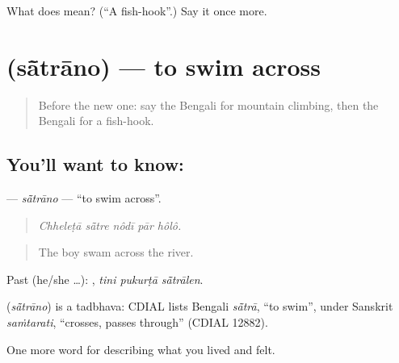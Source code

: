 \begin{tcolorbox}[breakable,colback=teal!4,colframe=teal!35!black,title={Before you move on}]
What does  mean? (\textquotedblleft{}A fish-hook\textquotedblright{}.) Say it once more.
\end{tcolorbox}
\section[\texorpdfstring{\bn{সাঁতরানো} (sā̃trāno)}{সাঁতরানো (sā̃trāno)}]{ (sā̃trāno) — to swim across}

\label{lesson:BN-C523-satrano}



\begin{quote}
Before the new one: say the Bengali for mountain climbing, then the Bengali for a fish-hook.
\end{quote}

\subsection*{You'll want to know: }
\textbf{} — \emph{sā̃trāno} — \textquotedblleft{}to swim across\textquotedblright{}.

\begin{quote}
    
\end{quote}

\begin{quote}
\emph{Chheleṭā sā̃tre nôdī pār hôlô.}
\end{quote}

\begin{quote}
The boy swam across the river.
\end{quote}

Past (he/she …):   , \emph{tini pukurṭā sā̃trālen}.

\begin{cousinweb}
\textbf{} (\emph{sā̃trāno}) is a tadbhava: CDIAL lists Bengali \emph{sā̃trā}, \textquotedblleft{}to swim\textquotedblright{}, under Sanskrit \emph{saṁtarati}, \textquotedblleft{}crosses, passes through\textquotedblright{} (CDIAL 12882).
\end{cousinweb}

\begin{grammarlens}[title={What you've built}]
One more word for describing what you lived and felt.
\end{grammarlens}

